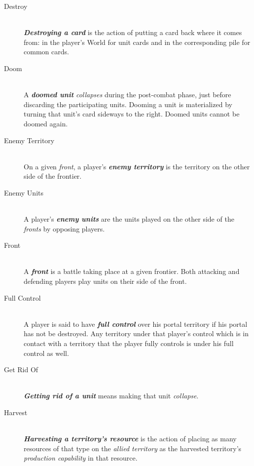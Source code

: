 \documentclass[a4paper]{article}
\begin{document}
\begin{description}
        \item[Destroy] \hfill \\
            \textbf{\textit{Destroying a card}} is the action of putting a card back
            where it comes from: in the player's World for unit cards and
            in the corresponding pile for common cards.
            
        \item[Doom] \hfill \\
            A \textbf{\textit{doomed unit}} \textit{collapses} during the post-combat
            phase, just before discarding the participating units.
            Dooming a unit is materialized by turning that unit's card
            sideways to the right.
            Doomed units cannot be doomed again.
            
        \item[Enemy Territory] \hfill \\
            On a given \textit{front}, a player's \textbf{\textit{enemy territory}}
            is the territory on the other side of the frontier.
            
        \item[Enemy Units] \hfill \\
            A player's \textbf{\textit{enemy units}} are the units played on the other side
            of the \textit{fronts} by opposing players.
            
        \item[Front] \hfill \\
            A \textbf{\textit{front}} is a battle taking place at a given frontier.
            Both attacking and defending players play units on their side of the front.
            
        \item[Full Control] \hfill \\
            A player is said to have \textbf{\textit{full control}} over his portal territory
            if his portal has not be destroyed.
            Any territory under that player's control which is in contact with
            a territory that the player fully controls is under his full control as well.
            
        \item[Get Rid Of] \hfill \\
            \textbf{\textit{Getting rid of a unit}} means making that unit
            \textit{collapse}.
            
        \item[Harvest] \hfill \\
            \textbf{\textit{Harvesting a territory's resource}} is the action of
            placing as many resources of that type on the \textit{allied territory}
            as the harvested territory's \textit{production capability} in that resource.
            

\end{description}
\end{document}
